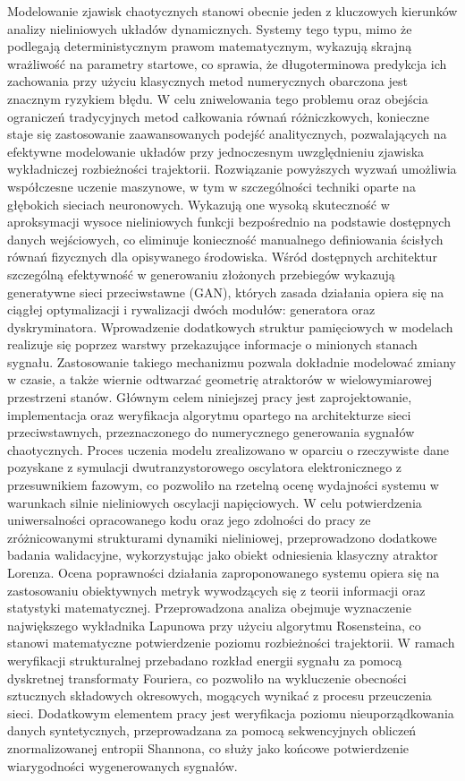 Modelowanie zjawisk chaotycznych stanowi obecnie jeden z kluczowych kierunków analizy nieliniowych układów dynamicznych. Systemy tego typu, mimo że podlegają deterministycznym prawom matematycznym, wykazują skrajną wrażliwość na parametry startowe, co sprawia, że długoterminowa predykcja ich zachowania przy użyciu klasycznych metod numerycznych obarczona jest znacznym ryzykiem błędu. W celu zniwelowania tego problemu oraz obejścia ograniczeń tradycyjnych metod całkowania równań różniczkowych, konieczne staje się zastosowanie zaawansowanych podejść analitycznych, pozwalających na efektywne modelowanie układów przy jednoczesnym uwzględnieniu zjawiska wykładniczej rozbieżności trajektorii.
Rozwiązanie powyższych wyzwań umożliwia współczesne uczenie maszynowe, w tym w szczególności techniki oparte na głębokich sieciach neuronowych. Wykazują one wysoką skuteczność w aproksymacji wysoce nieliniowych funkcji bezpośrednio na podstawie dostępnych danych wejściowych, co eliminuje konieczność manualnego definiowania ścisłych równań fizycznych dla opisywanego środowiska. Wśród dostępnych architektur szczególną efektywność w generowaniu złożonych przebiegów wykazują generatywne sieci przeciwstawne (GAN), których zasada działania opiera się na ciągłej optymalizacji i rywalizacji dwóch modułów: generatora oraz dyskryminatora. Wprowadzenie dodatkowych struktur pamięciowych w modelach realizuje się poprzez warstwy przekazujące informacje o minionych stanach sygnału. Zastosowanie takiego mechanizmu pozwala dokładnie modelować zmiany w czasie, a także wiernie odtwarzać geometrię atraktorów w wielowymiarowej przestrzeni stanów.
Głównym celem niniejszej pracy jest zaprojektowanie, implementacja oraz weryfikacja algorytmu opartego na architekturze sieci przeciwstawnych, przeznaczonego do numerycznego generowania sygnałów chaotycznych. Proces uczenia modelu zrealizowano w oparciu o rzeczywiste dane pozyskane z symulacji dwutranzystorowego oscylatora elektronicznego z przesuwnikiem fazowym, co pozwoliło na rzetelną ocenę wydajności systemu w warunkach silnie nieliniowych oscylacji napięciowych. W celu potwierdzenia uniwersalności opracowanego kodu oraz jego zdolności do pracy ze zróżnicowanymi strukturami dynamiki nieliniowej, przeprowadzono dodatkowe badania walidacyjne, wykorzystując jako obiekt odniesienia klasyczny atraktor Lorenza.
Ocena poprawności działania zaproponowanego systemu opiera się na zastosowaniu obiektywnych metryk wywodzących się z teorii informacji oraz statystyki matematycznej. Przeprowadzona analiza obejmuje wyznaczenie największego wykładnika Lapunowa przy użyciu algorytmu Rosensteina, co stanowi matematyczne potwierdzenie poziomu rozbieżności trajektorii. W ramach weryfikacji strukturalnej przebadano rozkład energii sygnału za pomocą dyskretnej transformaty Fouriera, co pozwoliło na wykluczenie obecności sztucznych składowych okresowych, mogących wynikać z procesu przeuczenia sieci. 
Dodatkowym elementem pracy jest weryfikacja poziomu nieuporządkowania danych syntetycznych, przeprowadzana za pomocą sekwencyjnych obliczeń znormalizowanej entropii Shannona, co służy jako końcowe potwierdzenie wiarygodności wygenerowanych sygnałów.